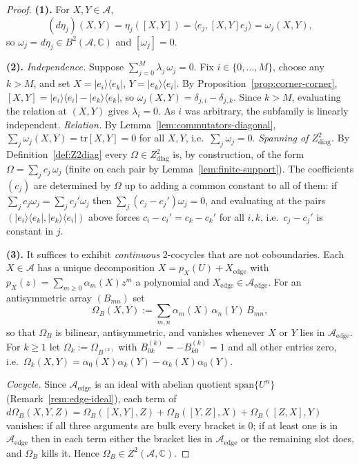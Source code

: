 \documentclass[10pt]{amsart}
\newcommand{\1}{{\mathbb{I}}}
\numberwithin{equation}{section}
\begin{document}
\begin{proof}
\textbf{(1).} For $X,Y\in\mathcal{A}$,
\[
(d\eta_j)(X,Y) = \eta_j([X,Y]) = \langle e_j,[X,Y]e_j\rangle = \omega_j(X,Y),
\]
so $\omega_j = d\eta_j \in B^2(\mathcal{A},\mathbb{C})$ and $[\omega_j]=0$.

\textbf{(2).} \emph{Independence.} Suppose $\sum_{j=0}^{M}\lambda_j\,\omega_j = 0$. Fix
$i\in\{0,\dots,M\}$, choose any $k>M$, and set $X=|e_i\rangle\langle e_k|$,
$Y=|e_k\rangle\langle e_i|$. By Proposition~\ref{prop:corner-corner},
$[X,Y]=|e_i\rangle\langle e_i|-|e_k\rangle\langle e_k|$, so
$\omega_j(X,Y)=\delta_{j,i}-\delta_{j,k}$. Since $k>M$, evaluating the relation at $(X,Y)$
gives $\lambda_i=0$. As $i$ was arbitrary, the subfamily is linearly independent.
\emph{Relation.} By Lemma~\ref{lem:commutators-diagonal},
$\sum_{j}\omega_j(X,Y)=\mathrm{tr}[X,Y]=0$ for all $X,Y$, i.e.\ $\sum_j\omega_j=0$.
\emph{Spanning of $Z^2_{\mathrm{diag}}$.} By Definition~\ref{def:Z2diag} every
$\Omega\in Z^2_{\mathrm{diag}}$ is, by construction, of the form $\Omega=\sum_j c_j\,\omega_j$
(finite on each pair by Lemma~\ref{lem:finite-support}). The coefficients $(c_j)$ are determined
by $\Omega$ up to adding a common constant to all of them: if $\sum_j c_j\omega_j=\sum_j c_j'\omega_j$
then $\sum_j(c_j-c_j')\omega_j=0$, and evaluating at the pairs $(|e_i\rangle\langle e_k|,
|e_k\rangle\langle e_i|)$ above forces $c_i-c_i'=c_k-c_k'$ for all $i,k$, i.e.\ $c_j-c_j'$ is
constant in $j$.

\textbf{(3).} It suffices to exhibit \emph{continuous} $2$-cocycles that are not coboundaries.
Each $X\in\mathcal{A}$ has a unique decomposition $X=p_X(U)+X_{\mathrm{edge}}$ with
$p_X(z)=\sum_{m\ge0}\alpha_m(X)z^m$ a polynomial and $X_{\mathrm{edge}}\in\mathcal{A}_{\mathrm{edge}}$.
For an antisymmetric array $(B_{mn})$ set
\[
\Omega_B(X,Y):=\sum_{m,n}\alpha_m(X)\,\alpha_n(Y)\,B_{mn},
\]
so that $\Omega_B$ is bilinear, antisymmetric, and vanishes whenever $X$ or $Y$ lies in
$\mathcal{A}_{\mathrm{edge}}$. For $k\ge1$ let $\Omega_k:=\Omega_{B^{(k)}}$ with
$B^{(k)}_{0k}=-B^{(k)}_{k0}=1$ and all other entries zero, i.e.\
$\Omega_k(X,Y)=\alpha_0(X)\alpha_k(Y)-\alpha_k(X)\alpha_0(Y)$.

\emph{Cocycle.} Since $\mathcal{A}_{\mathrm{edge}}$ is an ideal with abelian quotient
$\mathrm{span}\{U^n\}$ (Remark~\ref{rem:edge-ideal}), each term of
$d\Omega_B(X,Y,Z)=\Omega_B([X,Y],Z)+\Omega_B([Y,Z],X)+\Omega_B([Z,X],Y)$ vanishes: if all three
arguments are bulk every bracket is $0$; if at least one is in $\mathcal{A}_{\mathrm{edge}}$ then
in each term either the bracket lies in $\mathcal{A}_{\mathrm{edge}}$ or the remaining slot does,
and $\Omega_B$ kills it. Hence $\Omega_B\in Z^2(\mathcal{A},\mathbb{C})$.


\end{proof}
\end{document}

